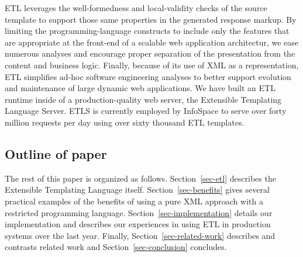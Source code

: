\documentclass{www2003-submission}
\newcommand{\secref}[1]{Section~\ref{sec-#1}}
\begin{document}
ETL leverages the well-formedness and local-validity checks of the
source template to support those same properties in the generated
response markup.  By limiting the programming-language constructs to
include only the features that are appropriate at the front-end of a
scalable web application architectur, we ease numerous analyses and
encourage proper separation of the presentation from the content and
business logic. Finally, because of its use of XML as a
representation, ETL simplifies ad-hoc software engineering analyses to
better support evolution and maintenance of large dynamic web
applications.  We have built an ETL runtime inside of a
production-quality web server, the Extensible Templating Language
Server.  ETLS is currently employed by InfoSpace to serve over forty
million requests per day using over sixty thousand ETL templates.

\subsection{Outline of paper}

The rest of this paper is organized as follows. \secref{etl} describes
the Extensible Templating Language itself. \secref{benefits} gives
several practical examples of the benefits of using a pure XML
approach with a restricted programming language. 
\secref{implementation} details our implementation and
describes our experiences in using ETL in production systems over the
last year.  Finally, \secref{related-work} describes and contrasts
related work and \secref{conclusion} concludes.





\end{document}

